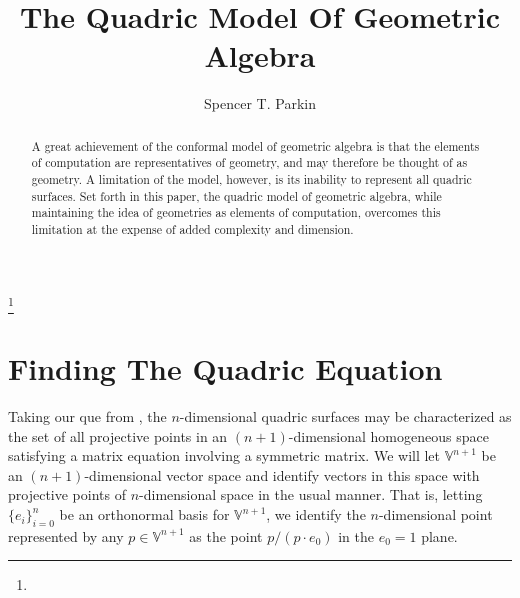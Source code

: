 \documentclass{ecgd-l}
\theoremstyle{definition}
\theoremstyle{remark}
\numberwithin{equation}{section}
\newcommand{\V}{\mathbb{V}}
\begin{document}
\title{The Quadric Model Of Geometric Algebra}


\author{Spencer T. Parkin}
\address{}
\curraddr{}
\thanks{}



\date{}

\dedicatory{}

\begin{abstract}
A great achievement of the conformal model of geometric algebra is that the elements
of computation are representatives of geometry, and may therefore be thought of as geometry.
A limitation of the model, however, is its inability to represent all quadric surfaces.
Set forth in this paper, the quadric model of geometric algebra, while maintaining the idea
of geometries as elements of computation, overcomes this limitation at the expense of
added complexity and dimension.
\end{abstract}

\maketitle


\nocite{DoranHestenes93}
\nocite{WikipediaQuadricEntry}

\section{Finding The Quadric Equation}

Taking our que from \cite{WikipediaQuadricEntry}, the $n$-dimensional quadric surfaces
may be characterized as the set of all projective points in an $(n+1)$-dimensional homogeneous space
satisfying a matrix equation involving a symmetric matrix.  We will let $\V^{n+1}$ be an
$(n+1)$-dimensional vector space and identify vectors in this space with projective
points of $n$-dimensional space in the usual manner.  That is, letting $\{e_i\}_{i=0}^n$
be an orthonormal basis for $\V^{n+1}$, we identify the $n$-dimensional point
represented by any $p\in\V^{n+1}$ as the point $p/(p\cdot e_0)$ in the $e_0=1$ plane.
\end{document}
